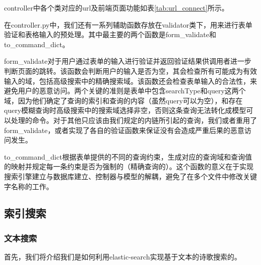 \documentclass[a4paper, 10pt]{article}
\begin{document}
controller中各个类对应的url及前端页面功能如表\ref{tab:url_connect}所示。

在controller.py中，我们还有一系列辅助函数存放在validator类下，用来进行表单验证和表格输入的预处理。其中最主要的两个函数是form\_validate和to\_command\_dict。

form\_validate对于用户通过表单的输入进行验证并返回验证结果供调用者进一步判断页面的跳转。该函数会判断用户的输入是否为空，其会检查所有可能成为有效输入的域，包括高级搜索中的精确搜索域。该函数还会检查表单输入的合法性，来避免用户的恶意访问。两个关键的准则是表单中包含searchType和query这两个域，因为他们确定了查询的索引和查询的内容（虽然query可以为空），和存在query模糊查询时高级搜索中的搜索域选择非空，否则这条查询无法转化成模型可以处理的命令。对于其他只应该由我们规定的内链所引起的查询，我们或者重用了form\_validate，或者实现了各自的验证函数来保证没有会造成严重后果的恶意访问发生。

to\_command\_dict根据表单提供的不同的查询约束，生成对应的查询域和查询值的映射并规定每一条约束是否为强制的（精确查询的）。这个函数的意义在于实现搜索引擎建立与数据库建立、控制器与模型的解耦，避免了在多个文件中修改关键字名称的工作。

\subsection{索引搜索}

\subsubsection{文本搜索}
首先，我们将介绍我们是如何利用elastic-search实现基于文本的诗歌搜索的。
\end{document}
